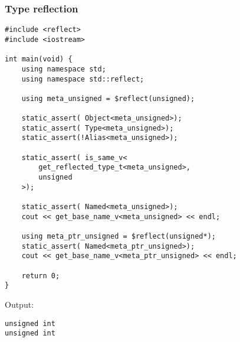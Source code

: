 \subsubsection{Type reflection}

\begin{verbatim}
#include <reflect>
#include <iostream>

int main(void) {
	using namespace std;
	using namespace std::reflect;

	using meta_unsigned = $reflect(unsigned);

	static_assert( Object<meta_unsigned>);
	static_assert( Type<meta_unsigned>);
	static_assert(!Alias<meta_unsigned>);

	static_assert( is_same_v<
		get_reflected_type_t<meta_unsigned>,
		unsigned
	>);

	static_assert( Named<meta_unsigned>);
	cout << get_base_name_v<meta_unsigned> << endl;

	using meta_ptr_unsigned = $reflect(unsigned*);
	static_assert( Named<meta_ptr_unsigned>);
	cout << get_base_name_v<meta_ptr_unsigned> << endl;

	return 0;
}
\end{verbatim}

Output:

\begin{verbatim}
unsigned int
unsigned int
\end{verbatim}


